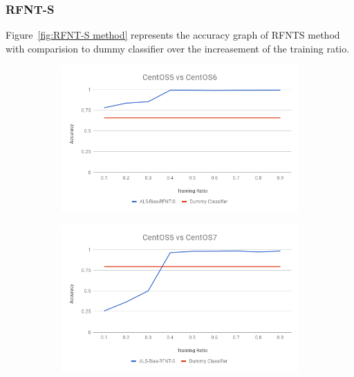\documentclass[10pt, conference, compsocconf]{IEEEtran}
\begin{document}
\subsubsection{RFNT-S}
Figure~\ref{fig:RFNT-S method} represents
the accuracy graph of RFNTS method with comparision to dummy
classifier over the increasement of the training ratio.
\begin{figure}[h!]
        \centering
        \begin{subfigure}[b]{0.8\linewidth}
                \includegraphics[width=\columnwidth]{figures/ALS-Bias/RFNT-S-ALS-Bias-5vs6-PFS}
        \end{subfigure}
        \begin{subfigure}[b]{0.8\linewidth}
                \includegraphics[width=\columnwidth]{figures/ALS-Bias/RFNT-S-ALS-Bias-5vs7-PFS}
        \end{subfigure}
        \begin{subfigure}[b]{0.8\linewidth}

\end{subfigure}
\end{figure}
\end{document}

